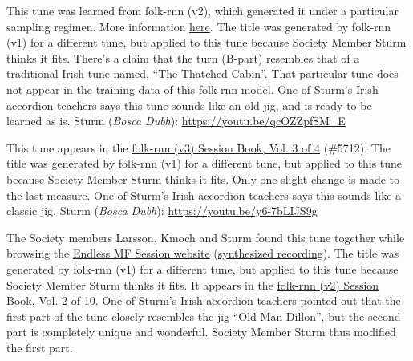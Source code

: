 \documentclass[a4paper,notitlepage,twoside]{book}
\begin{document}
\clearpage
{}
{}
\hypertarget{jig:BoysofBallinaburre}{}
This tune was learned from folk-rnn (v2),
which generated it under a particular sampling regimen.
More information \href{https://highnoongmt.wordpress.com/2019/08/19/making-sense-of-the-folk-rnn-v2-model-part-11/}{here}.
The title was generated by folk-rnn (v1) for a different tune, 
but applied to this tune because Society Member Sturm thinks it fits.
There's a claim that the turn (B-part) resembles that of a traditional Irish tune named, ``The Thatched Cabin''.
That particular tune does not appear in the training data of this folk-rnn model.
One of Sturm's Irish accordion teachers says this tune sounds like an old jig, 
and is ready to be learned as is.
Sturm ({\em Bosca Dubh}): \url{https://youtu.be/qcOZZpfSM_E}

{}
\hypertarget{jig:GallaghersFavourite}{}
This tune appears in the \href{https://highnoongmt.wordpress.com/2018/01/05/volumes-1-20-of-folk-rnn-v1-transcriptions}{folk-rnn (v3) Session Book, Vol. 3 of 4} (\#5712).
The title was generated by folk-rnn (v1) for a different tune, 
but applied to this tune because Society Member Sturm thinks it fits.
Only one slight change is made to the last measure.
One of Sturm's Irish accordion teachers says
this sounds like a classic jig.
Sturm ({\em Bosca Dubh}): \url{https://youtu.be/y6-7bLIJS9g}

{}
\hypertarget{jig:CleapersWheel}{}
The Society members Larsson, Kmoch and Sturm found this tune together 
while browsing the \href{http://www.eecs.qmul.ac.uk/~sturm/research/RNNIrishTrad/Session/}{Endless MF Session website}
(\href{http://www.eecs.qmul.ac.uk/~sturm/research/RNNIrishTrad/Session/5583_11843.mp3}{synthesized recording}).
The title was generated by folk-rnn (v1) for a different tune, 
but applied to this tune because Society Member Sturm thinks it fits.
It appears in the \href{https://highnoongmt.wordpress.com/2018/01/05/volumes-1-20-of-folk-rnn-v1-transcriptions}{folk-rnn (v2) Session Book, Vol. 2 of 10}.
One of Sturm's Irish accordion teachers pointed out that
the first part of the tune closely resembles the jig ``Old Man Dillon'',
but the second part is completely unique and wonderful.
Society Member Sturm thus modified the first part.
\end{document}
